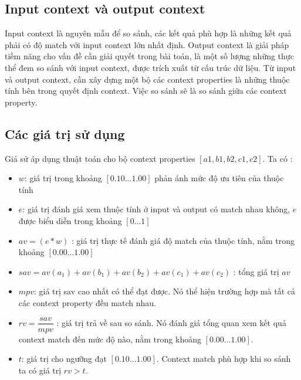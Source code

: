 \subsection{Input context và output context }	
Input context là nguyên mẫu để so sánh, các kết quả phù hợp là những kết quả phải có độ match với input context lớn nhất định. Output context là giải pháp tiềm năng cho vấn đề cần giải quyết trong bài toán, là một số lượng những thực thể đem so sánh với input context, được trích xuất từ cấu trúc dữ liệu. Từ input và output context, cần xây dựng một bộ các context properties là những thuộc tính bên trong quyết định context. Việc so sánh sẽ là so sánh giữa các context property.
\subsection{Các giá trị sử dụng}	
Giả sử áp dụng thuật toán cho bộ context properties $[a1, b1, b2, c1, c2]$. Ta có : 
\begin{itemize}
\item $w$: giá trị trong khoảng $[0.10...1.00]$ phản ánh mức độ ưu tiên của thuộc tính 
\item $e$:  giá trị đánh giá xem thuộc tính ở input và output có match nhau không, $e$ được biểu diễn trong khoảng $[0...1]$
\item $av = (e * w)$ :  giá trị thực tế đánh giá độ match của thuộc tính, nằm trong khoảng  $[0.00...1.00]$
\item $sav = av(a_1) + av(b_1) + av(b_2) + av(c_1) + av(c_2)$ : tổng giá trị $av$ 
\item $mpv$: giá trị sav cao nhất có thể đạt được. Nó thể hiện trường hợp mà tất cả các context property đều match nhau. 
\item $rv = \dfrac{sav}{mpv}$ : giá trị trả về sau so sánh. Nó đánh giá tổng quan xem kết quả context match đến mức độ nào, nằm trong khoảng $[0.00...1.00]$.  
\item $t$: giá trị cho ngưỡng đạt $[0.10...1.00]$. Context match  phù hợp khi so sánh ta có giá trị $rv > t$. 
 \end{itemize}
